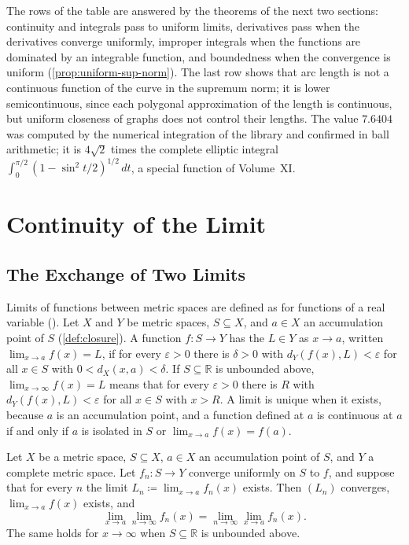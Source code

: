The rows of the table are answered by the theorems of the next two sections: continuity and integrals pass to uniform limits, derivatives pass when the derivatives converge uniformly, improper integrals when the functions are dominated by an integrable function, and boundedness when the convergence is uniform (\cref{prop:uniform-sup-norm}). The last row shows that arc length is not a continuous function of the curve in the supremum norm; it is lower semicontinuous, since each polygonal approximation of the length is continuous, but uniform closeness of graphs does not control their lengths. The value $7.6404$ was computed by the numerical integration of the library and confirmed in ball arithmetic; it is $4\sqrt2$ times the complete elliptic integral $\int_0^{\pi/2}(1-\sin^2t/2)^{1/2}\,dt$, a special function of Volume~XI.

\section{Continuity of the Limit}
\label{sec:limit-continuity}

\subsection{The Exchange of Two Limits}

Limits of functions between metric spaces are defined as for functions of a real variable (). Let $X$ and $Y$ be metric spaces, $S\subseteq X$, and $a\in X$ an accumulation point of $S$ (\cref{def:closure}). A function $f\colon S\to Y$ has the  $L\in Y$ as $x\to a$, written $\lim_{x\to a}f(x)=L$, if for every $\varepsilon>0$ there is $\delta>0$ with $d_Y(f(x),L)<\varepsilon$ for all $x\in S$ with $0<d_X(x,a)<\delta$. If $S\subseteq\mathbb R$ is unbounded above, $\lim_{x\to\infty}f(x)=L$ means that for every $\varepsilon>0$ there is $R$ with $d_Y(f(x),L)<\varepsilon$ for all $x\in S$ with $x>R$. A limit is unique when it exists, because $a$ is an accumulation point, and a function defined at $a$ is continuous at $a$ if and only if $a$ is isolated in $S$ or $\lim_{x\to a}f(x)=f(a)$.

\begin{theorem}
\label{thm:exchange-limits}
Let $X$ be a metric space, $S\subseteq X$, $a\in X$ an accumulation point of $S$, and $Y$ a complete metric space. Let $f_n\colon S\to Y$ converge uniformly on $S$ to $f$, and suppose that for every $n$ the limit $L_n\coloneqq\lim_{x\to a}f_n(x)$ exists. Then $(L_n)$ converges, $\lim_{x\to a}f(x)$ exists, and
\[
\lim_{x\to a}\lim_{n\to\infty}f_n(x)=\lim_{n\to\infty}\lim_{x\to a}f_n(x) .
\]
The same holds for $x\to\infty$ when $S\subseteq\mathbb R$ is unbounded above.
\end{theorem}

